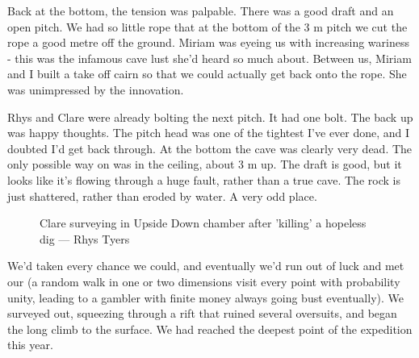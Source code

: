 Back at the bottom, the tension was palpable. There was a good draft and an open pitch. We had so little rope that at the bottom of the 3 m pitch we cut the rope a good metre off the ground. Miriam was eyeing us with increasing wariness - this was the infamous cave lust she’d heard so much about. Between us, Miriam and I built a take off cairn so that we could actually get back onto the rope. She was unimpressed by the innovation.
 
Rhys and Clare were already bolting the next pitch. It had one bolt. The back up was happy thoughts. The pitch head was one of the tightest I’ve ever done, and I doubted I’d get back through. At the bottom the cave was clearly very dead. The only possible way on was in the ceiling, about 3 m up. The draft is good, but it looks like it’s flowing through a huge fault, rather than a true cave. The rock is just shattered, rather than eroded by water. A very odd place.


\begin{figure}[h]
\checkoddpage \ifoddpage \forcerectofloat \else \forceversofloat \fi
\centering
{}
\caption{Clare surveying in Upside Down chamber after 'killing' a hopeless dig --- Rhys Tyers}
\label{Tight}
\end{figure}
 
We’d taken every chance we could, and eventually we’d run out of luck and met our  (a random walk in one or two dimensions visit every point with probability unity, leading to a gambler with finite money always going bust eventually). We surveyed out, squeezing through a rift that ruined several oversuits, and began the long climb to the surface. We had reached the deepest point of the expedition this year.
 

